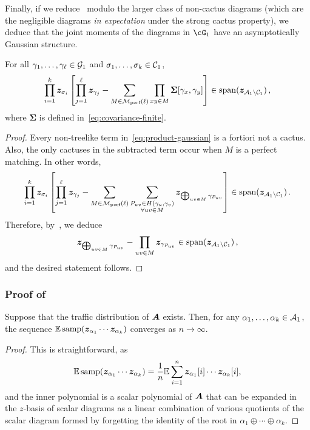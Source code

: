 Finally, if we reduce~ 
modulo the larger class of non-cactus diagrams
(which are the negligible diagrams {\em in expectation} under
the strong cactus property),
we deduce that the 
joint moments of the diagrams in
$\cG_1$ have an asymptotically Gaussian structure.

\begin{corollary}\label{lem:treelike-gaussian}
    For all $\gamma_1,\ldots,\gamma_\ell\in {\cal G}_1$ and $\sigma_1,\ldots,\sigma_k\in{\cal C}_1$,
     \[
        \prod_{i=1}^k {\bm z}_{\sigma_i} \left[\prod_{j=1}^\ell {\bm z}_{\gamma_j}  - \sum_{M\in \mathcal{M}_{\textnormal{perf}}(\ell)} \prod_{xy\in M} \bm \Sigma[\gamma_x,\gamma_y] \right]\in\operatorname{span}({\bm z}_{{\cal A}_1\setminus {\cal C}_1})\,,
     \]
     where $\bm \Sigma$ is defined in~\cref{eq:covariance-finite}.
\end{corollary}

\begin{proof}
    Every non-treelike term in~\cref{eq:product-gaussian}
    is a fortiori not a cactus. Also, the only
    cactuses in the subtracted term occur
    when $M$ is a perfect matching. In other words,
    \[
        \prod_{i=1}^k {\bm z}_{\sigma_i}\left[\prod_{j=1}^\ell {\bm z}_{\gamma_j} - \sum_{M\in \mathcal{M}_{\textnormal{perf}}(\ell)} \sum_{\substack{P_{uv}\in H(\gamma_u, \gamma_v)\\\forall uv\in M}} {\bm z}_{\bigoplus_{uv\in M} \gamma_{P_{uv}}}\right]\in \operatorname{span}({\bm z}_{{\cal A}_1\setminus {\cal C}_1})\,.
    \]
    Therefore, by~, we deduce
    \[
        {\bm z}_{\bigoplus_{uv\in M} \gamma_{P_{uv}}} - \prod_{uv\in M} {\bm z}_{\gamma_{P_{uv}}}\in \operatorname{span}({\bm z}_{{\cal A}_1\setminus {\cal C}_1})\,,
    \]
    and the desired statement follows.
\end{proof}



\subsubsection{Proof of~}
\label{sec:proof-convergence}

\begin{claim}
    \label{claim:existence-joint-moments}
    Suppose that the traffic distribution
    of ${\bm A}$ exists. Then, for any
    $\alpha_1, \ldots, \alpha_k\in{\cal A}_1$,
    the sequence $\operatorname*{\mathbb{E}} \mathrm{samp}({\bm z}_{\alpha_1} \cdots {\bm z}_{\alpha_k})$
    converges as $n\to\infty$.
\end{claim}

\begin{proof}
    This is straightforward, as
    \[
        \operatorname*{\mathbb{E}} \mathrm{samp}({\bm z}_{\alpha_1} \cdots {\bm z}_{\alpha_k}) = \frac 1n \mathbb{E} \sum_{i=1}^n {\bm z}_{\alpha_1}[i] \cdots {\bm z}_{\alpha_k}[i],
    \]
    and the inner polynomial is a scalar polynomial of ${\bm A}$ that can be expanded in the $z$-basis of scalar diagrams as a linear combination of various quotients of the scalar diagram formed by forgetting the identity of the root in $\alpha_1 \oplus \cdots \oplus \alpha_k$.
\end{proof}

